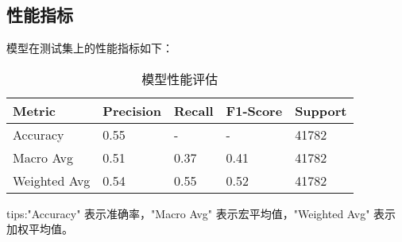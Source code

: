 \documentclass{article}
\begin{document}
\subsection{性能指标}

模型在测试集上的性能指标如下：\\
\begin{table}[h]
    \centering
    \begin{tabular}{|l|l|l|l|l|}
    \hline
    Metric & Precision & Recall & F1-Score & Support \\
    \hline
    Accuracy & 0.55 & - & - & 41782 \\
    Macro Avg & 0.51 & 0.37 & 0.41 & 41782 \\
    Weighted Avg & 0.54 & 0.55 & 0.52 & 41782 \\
    \hline
    \end{tabular}
    \caption{模型性能评估}
    \end{table}
    
    tips:"Accuracy" 表示准确率，"Macro Avg" 表示宏平均值，"Weighted Avg" 表示加权平均值。
\end{document}
